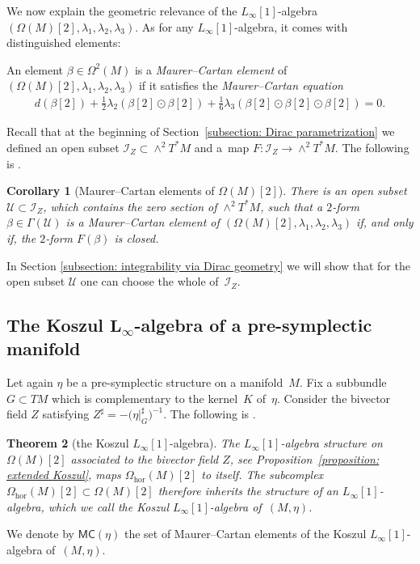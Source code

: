 \documentclass[10pt,a4paper]{amsart}
\numberwithin{equation}{section}
\newtheorem{Theorem}{Theorem}[section]
\newtheorem{Corollary}[Theorem]{Corollary}
\newcommand{\hor}{\mathrm{hor}}
\newcommand{\MC}{\mathsf{MC}}
\newcommand{\lione}{$L_{\infty}[1]$-algebra }
\begin{document}
We now explain the geometric relevance of the $L_{\infty}[1]$-algebra $(\Omega(M)[2],\lambda_1,\lambda_2,\lambda_3)$. As for any $L_\infty[1]$-algebra, it comes with distinguished elements:

\begin{Definition}\label{definition: Maurer--Cartan equation} An element $\beta \in \Omega^2(M)$ is a {\em Maurer--Cartan element} of $(\Omega(M)[2],\lambda_1,\lambda_2,\lambda_3)$ if it satisfies the {\em Maurer--Cartan equation}
\begin{gather*} d(\beta[2]) + \tfrac{1}{2}\lambda_2(\beta[2]\odot \beta[2]) + \tfrac{1}{6}\lambda_3(\beta[2]\odot \beta[2]\odot \beta[2])=0.\end{gather*}
\end{Definition}

Recall that at the beginning of Section~\ref{subsection: Dirac parametrization} we defined an open subset $\mathcal{I}_Z \subset {\wedge^2 T^*M}$ and a~map $F \colon \mathcal{I}_Z\to \wedge^2 T^*M$. The following is \cite[Corollary~3.9]{SZPre}.
\begin{Corollary}[Maurer--Cartan elements of {$\Omega(M)[2]$}]\label{corollary: MC for bivector fields} There is an open subset $\mathcal{U}\subset \mathcal{I}_Z$, which contains the zero section of $\wedge^2 T^*M$, such that a $2$-form $\beta \in \Gamma(\mathcal{U})$ is a Maurer--Cartan element of $(\Omega(M)[2],\lambda_1,\lambda_2,\lambda_3)$ if, and only if, the $2$-form $F(\beta)$ is closed.
\end{Corollary}

In Section \ref{subsection: integrability via Dirac geometry} we will show that for the open subset $\mathcal{U}$ one can choose the whole of~$\mathcal{I}_Z$.

\subsection[The Koszul $L_\infty$-algebra of a pre-symplectic manifold]{The Koszul $\boldsymbol{L_\infty}$-algebra of a pre-symplectic manifold}\label{subsection: Koszul for pre-symplectic}

Let again $\eta$ be a pre-symplectic structure on a manifold~$M$. Fix a subbundle $G\subset TM$ which is complementary to the kernel~$K$ of~$\eta$. Consider the bivector field $Z$ satisfying $Z^\sharp = -\big(\eta\vert_G^\sharp\big)^{-1}$. The following is \cite[Theorem~3.17]{SZPre}.

\begin{Theorem}[the Koszul {$L_\infty[1]$}-algebra]\label{theorem: construction - Koszul L-infty} The $L_{\infty}[1]$-algebra structure on $\Omega(M)[2]$ associated to the bivector field $Z$, see Proposition~{\rm \ref{proposition: extended Koszul}}, maps $\Omega_\hor(M)[2]$ to itself. The subcomplex $\Omega_\hor(M)[2] \subset \Omega(M)[2]$ therefore inherits the structure of an $L_\infty[1]$-algebra, which we call the Koszul $L_\infty[1]$-algebra of~$(M,\eta)$.
\end{Theorem}
 We denote by $\MC(\eta)$ the set of Maurer--Cartan elements of the Koszul \lione of~$(M,\eta)$.
\end{document}
